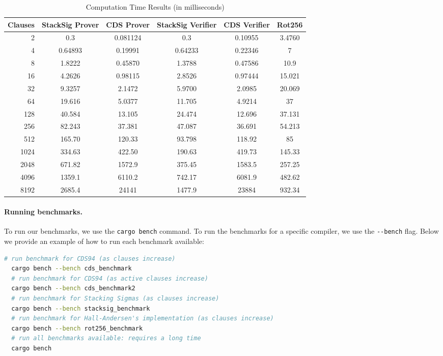 \begin{table}[H]
\centering
\caption{Computation Time Results (in milliseconds)}
\label{tab:comp-time}
\begin{tabular}{rccccc}
\toprule
\textbf{Clauses} & \textbf{StackSig Prover} & \textbf{CDS Prover} & \textbf{StackSig Verifier} & \textbf{CDS Verifier} & \textbf{Rot256} \\
\midrule
2 & 0.3 & 0.081124 & 0.3 & 0.10955 & 3.4760 \\
4 & 0.64893 & 0.19991 & 0.64233 & 0.22346 & 7 \\
8 & 1.8222 & 0.45870 & 1.3788 & 0.47586 & 10.9 \\
16 & 4.2626 & 0.98115 & 2.8526 & 0.97444 & 15.021 \\
32 & 9.3257 & 2.1472 & 5.9700 & 2.0985 & 20.069 \\
64 & 19.616 & 5.0377 & 11.705 & 4.9214 & 37 \\
128 & 40.584 & 13.105 & 24.474 & 12.696 & 37.131 \\
256 & 82.243 & 37.381 & 47.087 & 36.691 & 54.213 \\
512 & 165.70 & 120.33 & 93.798 & 118.92 & 85 \\
1024 & 334.63 & 422.50 & 190.63 & 419.73 & 145.33 \\
2048 & 671.82 & 1572.9 & 375.45 & 1583.5 & 257.25 \\
4096 & 1359.1 & 6110.2 & 742.17 & 6081.9 & 482.62 \\
8192 & 2685.4 & 24141 & 1477.9 & 23884 & 932.34 \\
\bottomrule
\end{tabular}
\end{table}

\paragraph{Running benchmarks.} To run our benchmarks, we use the \texttt{cargo bench} command. To run the benchmarks for a specific compiler, we use the \texttt{{-}{-}bench} flag. Below we provide an example of how to run each benchmark available:
\begin{lstlisting}[language=bash]
  # run benchmark for CDS94 (as clauses increase)
  cargo bench --bench cds_benchmark 
  # run benchmark for CDS94 (as active clauses increase)
  cargo bench --bench cds_benchmark2 
  # run benchmark for Stacking Sigmas (as clauses increase)
  cargo bench --bench stacksig_benchmark 
  # run benchmark for Hall-Andersen's implementation (as clauses increase)
  cargo bench --bench rot256_benchmark
  # run all benchmarks available: requires a long time
  cargo bench
\end{lstlisting}

